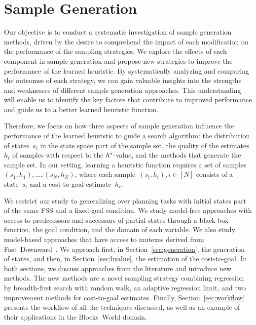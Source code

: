 \chapter{Sample Generation}
\label{sec:sampling}

Our objective is to conduct a systematic investigation of sample generation methods, driven by the desire to comprehend the impact of each modification on the performance of the sampling strategies. We explore the effects of each component in sample generation and propose new strategies to improve the performance of the learned heuristic. By systematically analyzing and comparing the outcomes of each strategy, we can gain valuable insights into the strengths and weaknesses of different sample generation approaches. This understanding will enable us to identify the key factors that contribute to improved performance and guide us to a better learned heuristic function.

Therefore, we focus on how three aspects of sample generation influence the performance of the learned heuristic to guide a search algorithm: the distribution of states~$s_i$ in the state space part of the sample set, the quality of the estimates~$h_i$ of samples with respect to the $h^{*}$-value, and the methods that generate the sample set. In our setting, learning a heuristic function requires a set of samples~$(s_1,h_1),\ldots,(s_N,h_N)$, where each sample~$(s_i,h_i), i\in[N]$ consists of a state~$s_i$ and a cost-to-goal estimate~$h_i$.

We restrict our study to generalizing over planning tasks with initial states part of the same FSS and a fixed goal condition. We study model-free approaches with access to predecessors and successors of partial states through a black-box function, the goal condition, and the domain of each variable. We also study model-based approaches that have access to mutexes derived from Fast~Downward~\cite{Helmert/2006}. We approach first, in Section~\ref{sec:generation}, the generation of states, and then, in Section~\ref{sec:hvalue}, the estimation of the cost-to-goal. In both sections, we discuss approaches from the literature and introduce new methods. The new methods are a novel sampling strategy combining regression by breadth-first search with random walk, an adaptive regression limit, and two improvement methods for cost-to-goal estimates. Finally, Section~\ref{sec:workflow} presents the workflow of all the techniques discussed, as well as an example of their applications in the Blocks~World domain.

